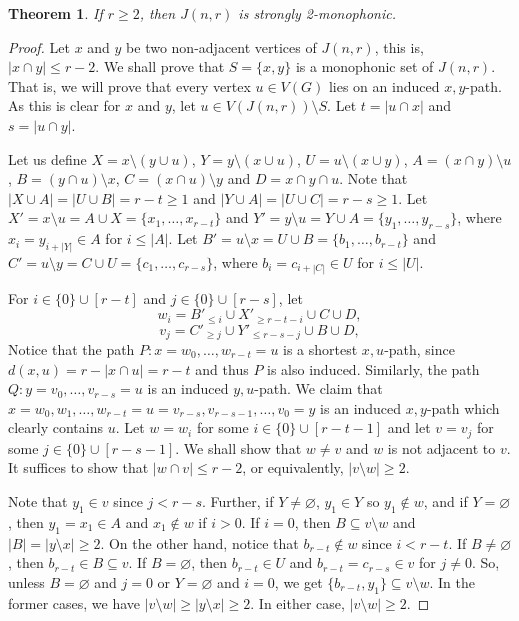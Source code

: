 \documentclass[a4paper,11pt]{article}
\newtheorem{theorem}{Theorem}
\renewcommand{\emptyset}{\varnothing}
\begin{document}
\begin{theorem}\label{thm:johnson-strong}
    If $r\geq 2$, then $J(n,r)$ is strongly 2-monophonic.
\end{theorem}
\begin{proof}
    Let $x$ and $y$ be two non-adjacent vertices of $J(n,r)$, this is, $|x\cap y|\leq r-2$. We shall prove that $S=\{x,y\}$ is a monophonic set of $J(n,r)$. That is, we will prove that every vertex $u\in V(G)$ lies on an induced $x,y$-path. 
    As this is clear for $x$ and $y$, let $u\in V(J(n,r))\setminus S$. Let $t=|u\cap x|$ and $s=|u\cap y|$. 
    
    Let us define $X=x\setminus(y\cup u)$, $Y=y\setminus(x\cup u)$, $U=u\setminus(x\cup y)$, $A=(x\cap y)\setminus u$, $B=(y\cap u)\setminus x$, $C=(x\cap u)\setminus y$ and $D=x\cap y\cap u$. Note that $|X\cup A|=|U\cup B|=r-t\geq 1$ and $|Y\cup A|=|U\cup C|=r-s \geq 1$.
    Let $X'=x\setminus u=A\cup X=\{x_1,\ldots,x_{r-t}\}$ and $Y'=y\setminus u=Y\cup A=\{y_1,\ldots,y_{r-s}\}$, where $x_i=y_{i+|Y|}\in A$ for $i\leq |A|$. Let $B'=u\setminus x=U\cup B=\{b_1,\ldots, b_{r-t}\}$ and $C'=u\setminus y=C\cup U=\{c_1,\ldots, c_{r-s}\}$, where $b_i=c_{i+|C|}\in U$ for $i\leq |U|$.
    
    For $i\in \{0\}\cup[r-t]$ and $j\in \{0\}\cup[r-s]$, let
    $$w_i=B'_{\leq i}\cup X'_{\geq r-t-i}\cup C\cup D,$$
    $$v_j=C'_{\geq j}\cup Y'_{\leq r-s-j}\cup B\cup D,$$
    Notice that the path $P:x=w_0,\ldots,w_{r-t}=u$ is a shortest $x,u$-path, since $d(x,u)=r-|x \cap u|=r-t$ and thus $P$ is also induced. Similarly, the path $Q:y=v_0,\ldots,v_{r-s}=u$ is an induced $y,u$-path. 
    We claim that $x=w_0,w_1,\ldots,w_{r-t}=u=v_{r-s},v_{r-s-1},\ldots,v_0=y$ is an induced $x,y$-path which clearly contains $u$.
    Let $w=w_i$ for some $i\in \{0\}\cup [r-t-1]$ and let $v=v_j$ for some $j\in \{0\}\cup [r-s-1]$. We shall show that $w\neq v$ and $w$ is not adjacent to $v$. It suffices to show that $|w\cap v|\leq r-2$, or equivalently, $|v\setminus w|\geq 2$.

    Note that $y_1\in v$ since $j<r-s$. Further, if $Y\neq \emptyset$, $y_1\in Y$ so $y_1\notin w$, and if $Y=\emptyset$, then $y_1=x_1\in A$ and $x_1\notin w$ if $i>0$. If $i=0$, then $B\subseteq v\setminus w$ and $|B|=|y\setminus x|\geq 2$.
    On the other hand, notice that $b_{r-t}\notin w$ since $i<r-t$. If $B\neq\emptyset$, then $b_{r-t}\in B\subseteq v$. If $B=\emptyset$, then $b_{r-t}\in U$ and $b_{r-t}=c_{r-s}\in v$ for $j\neq 0$. 
    So, unless $B=\emptyset$ and $j=0$ or $Y=\emptyset$ and $i=0$, we get $\{b_{r-t},y_1\}\subseteq v\setminus w$.
    In the former cases, we have $|v\setminus w|\geq |y\setminus x|\geq 2$.
    In either case, $|v\setminus w|\geq 2$.
\end{proof}
\end{document}
